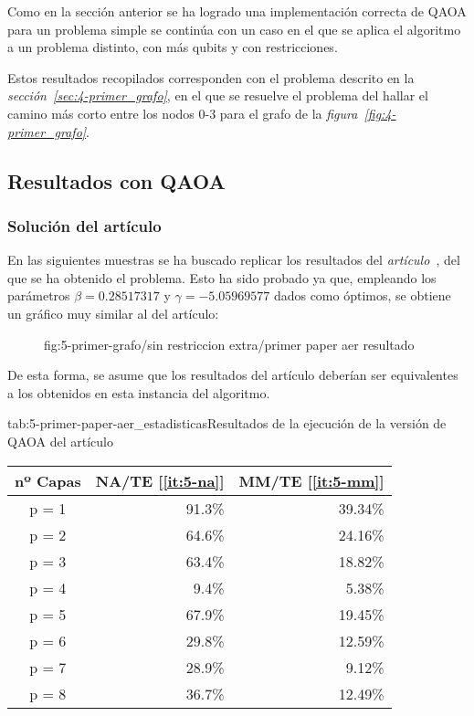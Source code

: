 Como en la sección anterior se ha logrado una implementación correcta de QAOA para un problema simple se continúa con un caso en el que se aplica el algoritmo a un problema distinto, con más qubits y con restricciones.

Estos resultados recopilados corresponden con el problema descrito en la \textit{sección~\ref{sec:4-primer_grafo}}, en el que se resuelve el problema del hallar el camino más corto entre los nodos 0{-}3 para el grafo de la \textit{figura~\ref{fig:4-primer_grafo}}.

\subsection{Resultados con QAOA}

\subsubsection{Solución del artículo\label{sec:5-primer-paper-resultados-qiskit}}
En las siguientes muestras se ha buscado replicar los resultados del \textit{artículo~\cite{multi-objective_routing_optimization}}, del que se ha obtenido el problema. Esto ha sido probado ya que, empleando los parámetros \(\beta = 0.28517317\) y \(\gamma = -5.05969577 \) dados como óptimos, se obtiene un gráfico muy similar al del artículo:

\begin{figure}[]{fig:5-primer-grafo/sin restriccion extra/primer paper aer resultado}{}
   \hfill
\end{figure}

De esta forma, se asume que los resultados del artículo deberían ser equivalentes a los obtenidos en esta instancia del algoritmo.

\begin{table}[htbp]{tab:5-primer-paper-aer_estadisticas}{Resultados de la ejecución de la versión de QAOA del artículo}
  \centering
  \begin{tabular}{|c|r|r|}
    \hline
    \textbf{nº Capas} & \textbf{NA/TE} [\ref{it:5-na}] & \textbf{MM/TE} [\ref{it:5-mm}] \\ \hline
    p = 1 & 91.3\% & 39.34\% \\ \hline
    p = 2 & 64.6\% & 24.16\% \\ \hline
    p = 3 & 63.4\% & 18.82\% \\ \hline
    p = 4 &  9.4\% &  5.38\% \\ \hline
    p = 5 & 67.9\% & 19.45\% \\ \hline
    p = 6 & 29.8\% & 12.59\% \\ \hline
    p = 7 & 28.9\% &  9.12\% \\ \hline
    p = 8 & 36.7\% & 12.49\% \\ \hline
  \end{tabular}
\end{table}

